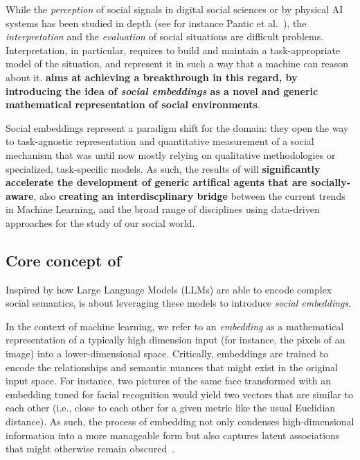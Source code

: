 While the \emph{perception} of social signals in digital social sciences or by
physical AI systems has been studied in depth (see for instance Pantic et
al.~\cite{pantic2011social}), the \emph{interpretation} and the
\emph{evaluation} of social situations are difficult problems.  Interpretation,
in particular, requires to build and maintain a task-appropriate model of the
situation, and represent it in such a way that a machine can reason about it.
\textbf{\project aims at achieving a breakthrough in this regard,
by introducing the idea of \emph{social embeddings} as a novel and generic mathematical
representation of social environments}. 

Social embeddings represent a paradigm shift for the domain: they open the way
to task-agnostic representation and quantitative measurement of a social
mechanism that was until now mostly relying on qualitative methodologies or
specialized, task-specific models. As such, the results of \project will
\textbf{significantly accelerate the development of generic artifical agents
that are socially-aware}, also \textbf{creating an interdiscplinary bridge}
between the current trends in Machine Learning, and the broad range of
disciplines using data-driven approaches for the study of our social world.


\subsection{Core concept of \project}

Inspired by how Large Language Models (LLMs) are able to encode complex social
semantics, \project is about leveraging these models to introduce
\emph{social embeddings}.

In the context of machine learning, we refer to an \emph{embedding} as a
mathematical representation of a typically high dimension input (for instance,
the pixels of an image) into a lower-dimensional space. Critically, embeddings
are trained to encode the relationships and semantic nuances that might exist in
the original input space. For instance, two pictures of the same face
transformed with an embedding tuned for facial recognition would yield two
vectors that are similar to each other (i.e., close to each other for a given
metric like the usual Euclidian distance). As such, the process of embedding not
only condenses high-dimensional information into a more manageable form but also
captures latent associations that might otherwise remain
obscured~\cite{bengio2009learning}.

